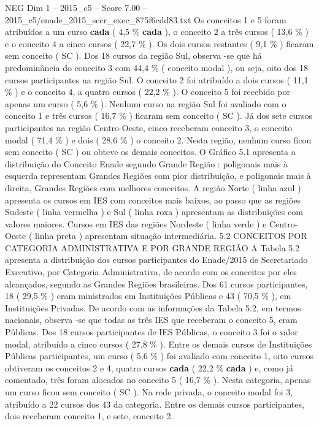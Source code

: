 \begin{textsample}{NEG Dim 1 – 2015\_c5 – Score 7.00 – 2015\_c5/enade\_2015\_secr\_exec\_875f6cdd83.txt}
Os conceitos 1 e 5 foram atribuídos a um curso \textbf{cada} ( 4,5 \% \textbf{cada} ), o conceito 2 a três cursos ( 13,6 \% ) e o conceito 4 a cinco cursos ( 22,7 \% ).
Os dois cursos restantes ( 9,1 \% ) ficaram sem conceito ( SC ).
Dos 18 cursos da região Sul, observa -se que há predominância do conceito 3 com 44,4 \% ( conceito modal ), ou seja, oito dos 18 cursos participantes na região Sul.
O conceito 2 foi atribuído a dois cursos ( 11,1 \% ) e o conceito 4, a quatro cursos ( 22,2 \% ).
O conceito 5 foi recebido por apenas um curso ( 5,6 \% ).
Nenhum curso na região Sul foi avaliado com o conceito 1 e três cursos ( 16,7 \% ) ficaram sem conceito ( SC ).
Já dos sete cursos participantes na região Centro-Oeste, cinco receberam conceito 3, o conceito modal ( 71,4 \% ) e dois ( 28,6 \% ) o conceito 2.
Nesta região, nenhum curso ficou sem conceito ( SC ) ou obteve os demais conceitos.
O Gráfico 5.1 apresenta a distribuição do Conceito Enade segundo Grande Região : poligonais mais à esquerda representam Grandes Regiões com pior distribuição, e poligonais mais à direita, Grandes Regiões com melhores conceitos.
A região Norte ( linha azul ) apresenta os cursos em IES com conceitos mais baixos, ao passo que as regiões Sudeste ( linha vermelha ) e Sul ( linha roxa ) apresentam as distribuições com valores maiores.
Cursos em IES das regiões Nordeste ( linha verde ) e Centro-Oeste ( linha preta ) apresentam situação intermediária. 5.2 CONCEITOS POR CATEGORIA ADMINISTRATIVA E POR GRANDE REGIÃO A Tabela 5.2 apresenta a distribuição dos cursos participantes do Enade/2015 de Secretariado Executivo, por Categoria Administrativa, de acordo com os conceitos por eles alcançados, segundo as Grandes Regiões brasileiras.
Dos 61 cursos participantes, 18 ( 29,5 \% ) eram ministrados em Instituições Públicas e 43 ( 70,5 \% ), em Instituições Privadas.
De acordo com as informações da Tabela 5.2, em termos nacionais, observa -se que todas as três IES que receberam o conceito 5, eram Públicas.
Dos 18 cursos participantes de IES Públicas, o conceito 3 foi o valor modal, atribuído a cinco cursos ( 27,8 \% ).
Entre os demais cursos de Instituições Públicas participantes, um curso ( 5,6 \% ) foi avaliado com conceito 1, oito cursos obtiveram os conceitos 2 e 4, quatro cursos \textbf{cada} ( 22,2 \% \textbf{cada} ) e, como já comentado, três foram alocados no conceito 5 ( 16,7 \% ).
Nesta categoria, apenas um curso ficou sem conceito ( SC ).
Na rede privada, o conceito modal foi 3, atribuído a 22 cursos dos 43 da categoria.
Entre os demais cursos participantes, dois receberam conceito 1, e sete, conceito 2.

\end{textsample}

